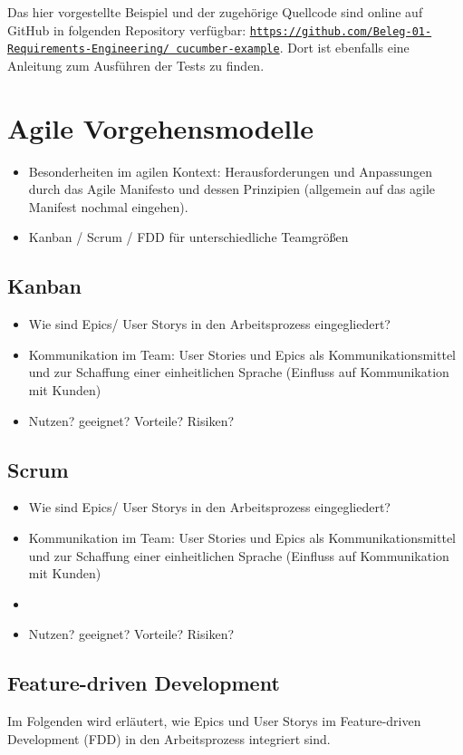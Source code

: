 \documentclass[acmtog]{acmart}
\begin{document}
Das hier vorgestellte Beispiel und der zugehörige Quellcode sind online auf GitHub in folgenden Repository verfügbar:
\href{https://github.com/Beleg-01-Requirements-Engineering/cucumber-example}{\texttt{https://github.com/Beleg-01-Requirements-Engineering/
		cucumber-example}}.
Dort ist ebenfalls eine Anleitung zum Ausführen der Tests zu finden.


\section{Agile Vorgehensmodelle}

\begin{itemize}
	\item Besonderheiten im agilen Kontext: Herausforderungen und Anpassungen durch das Agile Manifesto und dessen Prinzipien (allgemein auf das agile Manifest nochmal eingehen).
	\item Kanban / Scrum / FDD für unterschiedliche Teamgrößen
\end{itemize}

\subsection{Kanban}
\begin{itemize}
	\item Wie sind Epics/ User Storys in den Arbeitsprozess eingegliedert?
	\item Kommunikation im Team: User Stories und Epics als Kommunikationsmittel und zur Schaffung einer einheitlichen Sprache (Einfluss auf Kommunikation mit Kunden)
	\item Nutzen? geeignet? Vorteile? Risiken?
\end{itemize}

\subsection{Scrum}
\begin{itemize}
	\item Wie sind Epics/ User Storys in den Arbeitsprozess eingegliedert?
	\item Kommunikation im Team: User Stories und Epics als Kommunikationsmittel und zur Schaffung einer einheitlichen Sprache (Einfluss auf Kommunikation mit Kunden)
	\item \item Nutzen? geeignet? Vorteile? Risiken?
\end{itemize}

\subsection{Feature-driven Development}
Im Folgenden wird erläutert, wie Epics und User Storys im Feature-driven Development (FDD) in den Arbeitsprozess integriert sind.
\end{document}
